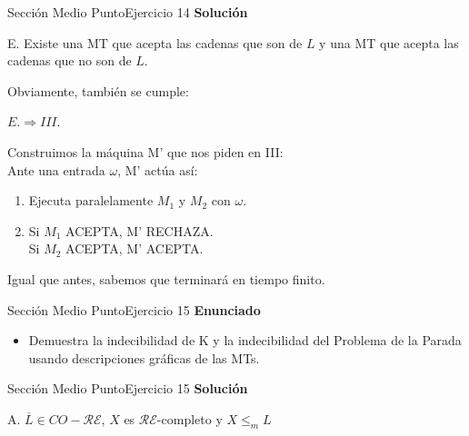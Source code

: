 \documentclass[10pt, envcountsect, presentation, aspectratio=169]{beamer}
\newcommand{\lr}{\ensuremath{\mathcal {RE}}}
\begin{document}
\begin{frame}{Sección Medio Punto}{Ejercicio 14}
    \textbf{Solución}\\
     \begin{center}
        E. Existe una MT que acepta las cadenas que son de $L$ y una MT que acepta las cadenas que no son de $L$.   
    \end{center}
    Obviamente, también se cumple: 
    \begin{center}
        $E. \Rightarrow III.$
    \end{center}
    Construimos la máquina M' que nos piden en III:\\
    Ante una entrada $\omega$, M' actúa así:
    \begin{enumerate}[1.] 
        \item Ejecuta paralelamente $M_1$ y $M_2$ con $\omega$. 
        \item   Si $M_1$ ACEPTA, M' RECHAZA.\\
                Si $M_2$ ACEPTA, M' ACEPTA.
    \end{enumerate}

    \vspace{3mm}
    Igual que antes, sabemos que terminará en tiempo finito.
    
\end{frame}

\begin{frame}{Sección Medio Punto}{Ejercicio 15}
    \textbf{Enunciado}
    \begin{itemize}
        \item Demuestra la indecibilidad de K y la indecibilidad del Problema de la Parada usando descripciones gráficas de las MTs.
    \end{itemize}
\end{frame}


\begin{frame}{Sección Medio Punto}{Ejercicio 15}
    \textbf{Solución}\\
    \begin{center}
        A. $\overline{L} \in CO-\lr$, $X$ es \lr-completo y $X \le_m  L$
    \end{center}
    
    
\end{frame}

\end{document}
